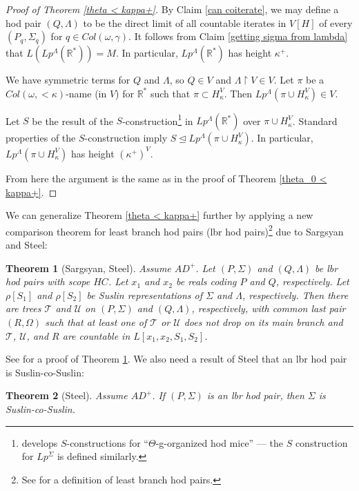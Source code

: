\documentclass[12pt]{article}
\newtheorem{theorem}{Theorem}[section]
\newcommand\T{\mathcal{T}}
\newcommand\R{\mathbb{R}}
\newcommand\U{\mathcal{U}}
\begin{document}
\begin{proof}[Proof of Theorem \ref{theta < kappa+}]
    By Claim \ref{can coiterate}, we may define a hod pair $(Q,\Lambda)$ to be the direct limit of all countable iterates in $V[H]$ of every $(P_q,\Sigma_q)$ for $q\in Col(\omega,\gamma)$. It follows from Claim \ref{getting sigma from lambda} that $L(Lp^{\Lambda}(\R^*)) = M$. In particular, $Lp^{\Lambda}(\R^*)$ has height $\kappa^+$.

    We have symmetric terms for $Q$ and $\Lambda$, so $Q\in V$ and $\Lambda \upharpoonright V \in V$. Let $\pi$ be a $Col(\omega,<\kappa)$-name (in $V$) for $\R^*$ such that $\pi\subset H_\kappa^V$. Then $Lp^{\Lambda}(\pi\cup H^V_\kappa)\in V$.

    Let $S$ be the result of the $S$-construction\footnote{\cite{sihmor} develops $S$-constructions for ``$\Theta$-g-organized hod mice'' --- the $S$ construction for $Lp^\Sigma$ is defined similarly.} in $Lp^{\Lambda}(\R^*)$ over $\pi\cup H^V_\kappa$. Standard properties of the $S$-construction imply $S \trianglelefteq Lp^{\Lambda}(\pi\cup H^V_\kappa)$. In particular, $Lp^{\Lambda}(\pi\cup H_\kappa^V)$ has height $(\kappa^+)^V$.

    From here the argument is the same as in the proof of Theorem \ref{theta_0 < kappa+}.
\end{proof}

We can generalize Theorem \ref{theta < kappa+} further by applying a new comparison theorem for least branch hod pairs (lbr hod pairs)\footnote{See \cite{lbrbook} for a definition of least branch hod pairs.} due to Sargsyan and Steel:

\begin{theorem}[Sargsyan, Steel]
\label{lbr comparison}
    Assume $AD^+$. Let $(P,\Sigma)$ and $(Q,\Lambda)$ be lbr hod pairs with scope $HC$. Let $x_1$ and $x_2$ be reals coding $P$ and $Q$, respectively. Let $\rho[S_1]$ and $\rho[S_2]$ be Suslin representations of $\Sigma$ and $\Lambda$, respectively. Then there are trees $\T$ and $\U$ on $(P,\Sigma)$ and $(Q,\Lambda)$, respectively, with common last pair $(R,\Omega)$ such that at least one of $\T$ or $\U$ does not drop on its main branch and $\T$, $\U$, and $R$ are countable in $L[x_1,x_2,S_1,S_2]$.
\end{theorem}

See \cite{lbr_comparison} for a proof of Theorem \ref{lbr comparison}. We also need a result of Steel that an lbr hod pair is Suslin-co-Suslin:

\begin{theorem}[Steel]
\label{lbr strategy suslin-co-suslin}
    Assume $AD^+$. If $(P,\Sigma)$ is an lbr hod pair, then $\Sigma$ is Suslin-co-Suslin.
\end{theorem}
\end{document}

